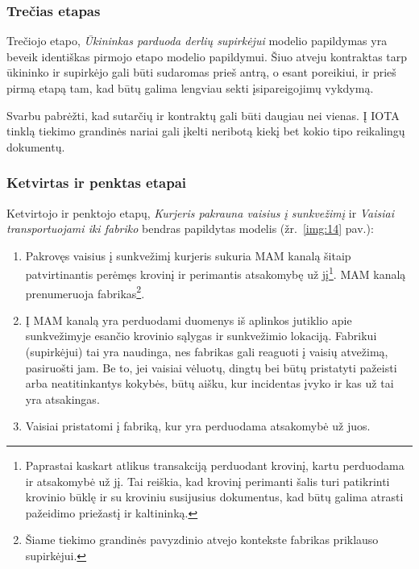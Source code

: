 
\subsubsection{Trečias etapas} \label{subsection:uc-3}

Trečiojo etapo, \textit{Ūkininkas parduoda derlių supirkėjui} modelio papildymas yra beveik identiškas pirmojo etapo modelio papildymui. Šiuo atveju kontraktas tarp ūkininko ir supirkėjo gali būti sudaromas prieš antrą, o esant poreikiui, ir prieš pirmą etapą tam, kad būtų galima lengviau sekti įsipareigojimų vykdymą.

Svarbu pabrėžti, kad sutarčių ir kontraktų gali būti daugiau nei vienas. Į IOTA tinklą tiekimo grandinės nariai gali įkelti neribotą kiekį bet kokio tipo reikalingų dokumentų.




\subsubsection{Ketvirtas ir penktas etapai} \label{subsection:uc-4-5}

Ketvirtojo ir penktojo etapų, \textit{Kurjeris pakrauna vaisius į sunkvežimį} ir \textit{Vaisiai transportuojami iki fabriko} bendras papildytas modelis (žr.~\ref{img:14} pav.):
\begin{enumerate}
    \item Pakrovęs vaisius į sunkvežimį kurjeris sukuria MAM kanalą šitaip patvirtinantis perėmęs krovinį ir perimantis atsakomybę už jį\footnote{Paprastai kaskart atlikus transakciją perduodant krovinį, kartu perduodama ir atsakomybė už jį. Tai reiškia, kad krovinį perimanti šalis turi patikrinti krovinio būklę ir su kroviniu susijusius dokumentus, kad būtų galima atrasti pažeidimo priežastį ir kaltininką.}. MAM kanalą prenumeruoja fabrikas\footnote{Šiame tiekimo grandinės pavyzdinio atvejo kontekste fabrikas priklauso supirkėjui.}.
    \item Į MAM kanalą yra perduodami duomenys iš aplinkos jutiklio apie sunkvežimyje esančio krovinio sąlygas ir sunkvežimio lokaciją. Fabrikui (supirkėjui) tai yra naudinga, nes fabrikas gali reaguoti į vaisių atvežimą, pasiruošti jam. Be to, jei vaisiai vėluotų, dingtų bei būtų pristatyti pažeisti arba neatitinkantys kokybės, būtų aišku, kur incidentas įvyko ir kas už tai yra atsakingas.
    \item Vaisiai pristatomi į fabriką, kur yra perduodama atsakomybė už juos.
\end{enumerate}

